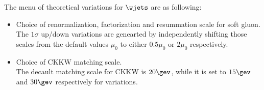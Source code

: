 The menu of theoretical variations for $\wjets$ are as following:
\begin{itemize}
\item Choice of renormalization, factorization and resummation scale for soft gluon. \\
The $1\sigma$ up/down variations are genearted by independently shifting those scales from the default values $\mu_0$ to either $0.5\mu_0$ or $2\mu_0$ respectively.  

\item Choice of CKKW matching scale.\\
The decault matching scale for CKKW is $20\gev$, while it is set to $15\gev$ and $30\gev$ respectively for variations. \\
\end{itemize} 




